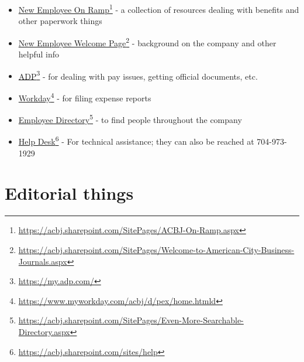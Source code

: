 \documentclass[
  11pt,
  american,
  letterpaperpaper,
  extrafontsizes,onecolumn,openright
  ]{memoir}
\providecommand{\tightlist}{%
  \setlength{\itemsep}{0pt}\setlength{\parskip}{0pt}}
\begin{document}
\begin{itemize}
\tightlist
\item
  \href{https://acbj.sharepoint.com/SitePages/ACBJ-On-Ramp.aspx}{New Employee On Ramp}\footnote{\url{https://acbj.sharepoint.com/SitePages/ACBJ-On-Ramp.aspx}} - a collection of resources dealing with benefits and other paperwork things
\item
  \href{https://acbj.sharepoint.com/SitePages/Welcome-to-American-City-Business-Journals.aspx}{New Employee Welcome Page}\footnote{\url{https://acbj.sharepoint.com/SitePages/Welcome-to-American-City-Business-Journals.aspx}} - background on the company and other helpful info
\item
  \href{https://my.adp.com/}{ADP}\footnote{\url{https://my.adp.com/}} - for dealing with pay issues, getting official documents, etc.
\item
  \href{https://www.myworkday.com/acbj/d/pex/home.htmld}{Workday}\footnote{\url{https://www.myworkday.com/acbj/d/pex/home.htmld}} - for filing expense reports
\item
  \href{https://acbj.sharepoint.com/SitePages/Even-More-Searchable-Directory.aspx}{Employee Directory}\footnote{\url{https://acbj.sharepoint.com/SitePages/Even-More-Searchable-Directory.aspx}} - to find people throughout the company
\item
  \href{https://acbj.sharepoint.com/sites/help}{Help Desk}\footnote{\url{https://acbj.sharepoint.com/sites/help}} - For technical assistance; they can also be reached at 704-973-1929
\end{itemize}

\newpage

\hypertarget{editorial-things}{%
\section*{Editorial things}\label{editorial-things}}
\end{document}
